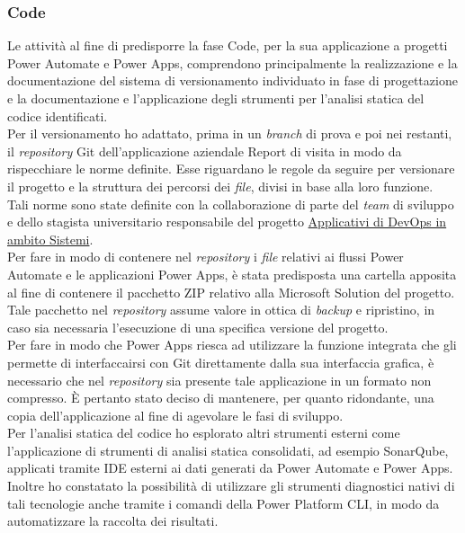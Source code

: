 \subsubsection*{Code}
Le attività al fine di predisporre la fase Code, per la sua applicazione a progetti Power Automate e Power Apps, comprendono principalmente la realizzazione e la documentazione del sistema di versionamento individuato in fase di progettazione e la documentazione e l'applicazione degli strumenti per l'analisi statica del codice identificati.\\
Per il versionamento ho adattato, prima in un \emph{branch} di prova e poi nei restanti, il \emph{repository} Git dell'applicazione aziendale Report di visita in modo da rispecchiare le norme definite.
Esse riguardano le regole da seguire per versionare il progetto e la struttura dei percorsi dei \emph{file}, divisi in base alla loro funzione.\\  
Tali norme sono state definite con la collaborazione di parte del \emph{team} di sviluppo e dello stagista universitario responsabile del progetto \hyperref[stageDavide]{Applicativi di DevOps in ambito Sistemi}.\\ 
Per fare in modo di contenere nel \emph{repository} i \emph{file} relativi ai flussi Power Automate e le applicazioni Power Apps, è stata predisposta una cartella apposita al fine di contenere il pacchetto ZIP relativo alla Microsoft Solution del progetto.\\ 
Tale pacchetto nel \emph{repository} assume valore in ottica di \emph{backup} e ripristino, in caso sia necessaria l'esecuzione di una specifica versione del progetto.\\  
Per fare in modo che Power Apps riesca ad utilizzare la funzione integrata che gli permette di interfaccairsi con Git direttamente dalla sua interfaccia grafica, è necessario che nel \emph{repository} sia presente tale applicazione in un formato non compresso. È pertanto stato deciso di mantenere, per quanto ridondante, una copia dell'applicazione al fine di agevolare le fasi di sviluppo.\\ 
Per l'analisi statica del codice ho esplorato altri strumenti esterni come l'applicazione di strumenti di analisi statica consolidati, ad esempio SonarQube, applicati tramite IDE esterni ai dati generati da Power Automate e Power Apps.\\  
Inoltre ho constatato la possibilità di utilizzare gli strumenti diagnostici nativi di tali tecnologie anche tramite i comandi della Power Platform CLI, in modo da automatizzare la raccolta dei risultati.\\ 

